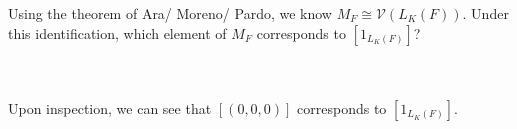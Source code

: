 Using the theorem of Ara/ Moreno/ Pardo, we know $M_F\cong\mathcal{V}(L_K(F))$. Under this
identification, which element of $M_F$ corresponds to $[1_{L_K(F)}]$?\\\\

\begin{solution}\renewcommand{\qedsymbol}{}\ \\
    Upon inspection, we can see that $[(0,0,0)]$ corresponds to $[1_{L_K(F)}]$.
\end{solution}